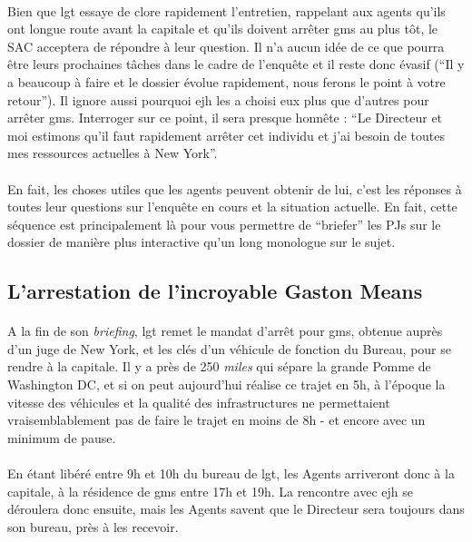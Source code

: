 \paragraph{} Bien que \gls{lgt} essaye de clore rapidement l'entretien, rappelant aux agents qu'ils ont longue route avant la capitale
et qu'ils doivent arrêter \gls{gms} au plus tôt, le SAC acceptera de répondre à leur question. Il n'a aucun idée de ce que pourra
être leurs prochaines tâches dans le cadre de l'enquête et il reste donc évasif (``Il y a beaucoup à faire et le dossier évolue
rapidement, nous ferons le point à votre retour''). Il ignore aussi pourquoi \gls{ejh} les a choisi eux plus que d'autres pour arrêter 
\gls{gms}. Interroger sur ce point, il sera presque honnête : ``Le Directeur et moi estimons qu'il faut rapidement arrêter cet 
individu et j'ai besoin de toutes mes ressources actuelles à New York''.

\paragraph{} En fait, les choses utiles que les agents peuvent obtenir de lui, c'est les réponses à toutes leur questions sur 
l'enquête en cours et la situation actuelle. En fait, cette séquence est principalement là pour vous permettre de ``briefer'' les PJs
sur le dossier de manière plus interactive qu'un long monologue sur le sujet. 

\subsection{L'arrestation de l'incroyable Gaston Means}

\paragraph{} A la fin de son \emph{briefing}, \gls{lgt} remet le mandat d'arrêt pour \gls{gms}, obtenue auprès d'un juge de New York,
et les clés d'un véhicule de fonction du Bureau, pour se rendre à la capitale. Il y a près de 250 \emph{miles} qui sépare la grande
Pomme de Washington DC, et si on peut aujourd'hui réalise ce trajet en 5h, à l'époque la vitesse des véhicules et la qualité des 
infrastructures ne permettaient vraisemblablement pas de faire le trajet en moins de 8h - et encore avec un minimum de pause. 

\paragraph{} En étant libéré entre 9h et 10h du bureau de \gls{lgt}, les Agents arriveront donc à la capitale, à la résidence de 
\gls{gms} entre 17h et 19h. La rencontre avec \gls{ejh} se déroulera donc ensuite, mais les Agents savent que le Directeur sera
toujours dans son bureau, près à les recevoir.

